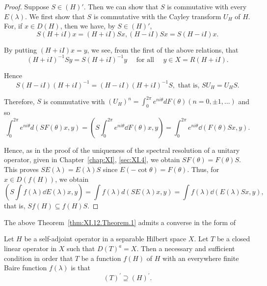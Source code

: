 \begin{proof}
 Suppose $S \in (H)'$. Then we can show that $S$ is commutative with every $E(\lambda)$. We first show that $S$ is commutative with the Cayley transform $U_{H}$ of $H$. For, if $x \in D(H)$, then we have, by $S \in (H)'$, 
\[
S (H + i I) x = (H + i I) S x, (H - i I) S x = S (H - i I) x. \]

By putting $(H + iI)x = y$, we see, from the first of the above relations, that 
\[
(H + i I) ^{-1} S y = S (H + i I) ^{-1} y \quad \text{ for all } \quad y \in X = R (H + i I).
\]

Hence 
\[
S (H - i I) (H + i I) ^{-1} = (H - i I) (H + i I) ^{-1} S, \text{ that is, } S U _{H} = U _{H} S.
\]

Therefore, $S$ is commutative with $(U_H)^n = \int_0^{2\pi} e^{ni\theta} dF(\theta) (n = 0, \pm 1, \ldots)$ and so 
\[
\int_{0} ^{2 \pi} e ^{n i \theta} d (S F (\theta) x, y) = \left(S \int_{0} ^{2 \pi} e ^{n i \theta} \dd F (\theta) x, y\right) = \int_{0} ^{2 \pi} e ^{n i \theta} \dd (F (\theta) S x, y).
\]

Hence, as in the proof of the uniqueness of the spectral resolution of a unitary operator, given in Chapter~\ref{chap:XI}, \ref{sec:XI.4}, we obtain $SF(\theta) = F(\theta)S$. This proves $SE(\lambda) = E(\lambda)S$ since $E(-\cot \theta) = F(\theta)$. Thus, for $x \in D(f(H))$,  
we obtain 
\[
(S \int f (\lambda) \dd E (\lambda) x, y) = \int f (\lambda) d (S E (\lambda) x, y) = \int f (\lambda) \dd (E (\lambda) S x, y),
\]
that is, $Sf(H) \subseteq f(H) S$. 
\end{proof}

The above Theorem~\ref{thm:XI.12.Theorem.1} admits a converse in the form of 

\begin{theorem}\label{thm:XI.12.Theorem.2} Let $H$ be a self-adjoint operator in a separable Hilbert space $X$. Let $T$ be a closed linear operator in $X$ such that $D(T)^{a} = X$. Then a necessary and sufficient condition in order that $T$ be a function $f(H)$ of $H$ with an everywhere finite Baire function $f(\lambda)$ is that 
\begin{equation}\label{eq:XI.12.7}
(T) ^{\prime} \supseteq (H) ^{\prime}.
\end{equation}
\end{theorem}


